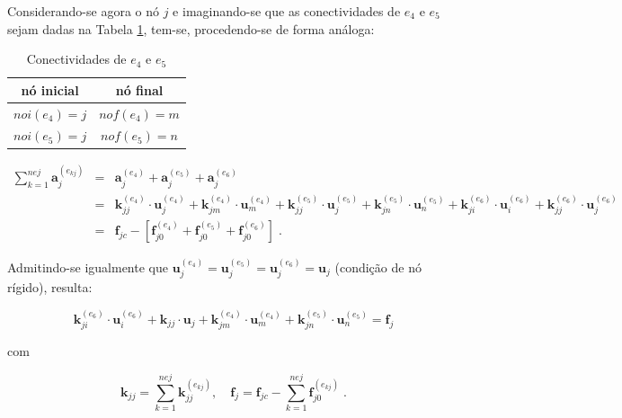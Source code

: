 Considerando-se agora o nó \(j\) e imaginando-se que as conectividades de \(e_4\) e \(e_5\) sejam dadas na Tabela \ref{conect_eJ}, tem-se, procedendo-se de forma análoga:
\begin{table}[htb!]
	\centering
	\caption{Conectividades de \(e_4\) e \(e_5\)}	\label{conect_eJ}
	\begin{tabular}{c|c}
		nó inicial     & nó final       \\  \hline
		\(noi(e_4)=j\) & \(nof(e_4)=m\) \\ %
		\(noi(e_5)=j\) & \(nof(e_5)=n\)
	\end{tabular}
\end{table}
\begin{align*}
	\sum\limits_{k=1}^{nej}\mathbf{a}_{j}^{(e_{kj})} & = & \mathbf{a}_{j}^{(e_{4})}+\mathbf{a}_{j}^{(e_{5})}+\mathbf{a}_{j}^{(e_{6})} \nonumber                                                                                                                                                                                                                                                 \\
	                                             & = & \mathbf{k}_{jj}^{(e_{4})} \cdot \mathbf{u}_{j}^{(e_{4})} + \mathbf{k}_{jm}^{(e_{4})} \cdot \mathbf{u}_{m}^{(e_{4})} + \mathbf{k}_{jj}^{(e_{5})} \cdot \mathbf{u}_{j}^{(e_{5})} + \mathbf{k}_{jn}^{(e_{5})} \cdot \mathbf{u}_{n}^{(e_{5})} +\mathbf{k}_{ji}^{(e_{6})} \cdot \mathbf{u}_{i}^{(e_{6})} + \mathbf{k}_{jj}^{(e_{6})} \cdot \mathbf{u}_{j}^{(e_{6})} \nonumber \\
	                                             & = & \mathbf{f}_{jc} - \left [ \mathbf{f}_{j0}^{(e_{4})}+\mathbf{f}_{j0}^{(e_{5})}+\mathbf{f}_{j0}^{(e_{6})}\right ]  \; .
\end{align*}

\noindent Admitindo-se igualmente que \(\mathbf{u}_{j}^{(e_{4})}=\mathbf{u}_{j}^{(e_{5})}=\mathbf{u}_{j}^{(e_{6})}=\mathbf{u}_{j}\) (condição de nó rígido), resulta:

\[\mathbf{k}_{ji}^{(e_{6})} \cdot \mathbf{u}_{i}^{(e_{6})} +\mathbf{k}_{jj}\cdot \mathbf{u}_j + \mathbf{k}_{jm}^{(e_{4})} \cdot \mathbf{u}_{m}^{(e_{4})} + \mathbf{k}_{jn}^{(e_{5})} \cdot \mathbf{u}_{n}^{(e_{5})} = \mathbf{f}_j \]

\noindent com

\[\mathbf{k}_{jj}=\sum\limits_{k=1}^{nej}\mathbf{k}_{jj}^{(e_{kj})}, \quad \mathbf{f}_j=\mathbf{f}_{jc} - \sum\limits_{k=1}^{nej}\mathbf{f}_{j0}^{(e_{kj})}\; . \]

